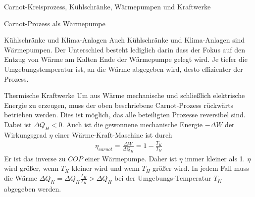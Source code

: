 \begin{chapter}{\titlestr}
\begin{section}{Carnot-Kreisprozess, Kühlschränke, Wärmepumpen und Kraftwerke}
\begin{subsection}{Carnot-Prozess als Wärmepumpe}
\begin{subsubsection}{Kühlschränke und Klima-Anlagen}
Auch Kühlschränke und Klima-Anlagen sind Wärmepumpen. Der Unterschied besteht lediglich darin dass der Fokus auf den Entzug von Wärme am Kalten Ende der Wärmepumpe
gelegt wird. Je tiefer die Umgebungstemperatur ist, an die Wärme abgegeben wird, desto effizienter der Prozess.
\end{subsubsection}
\end{subsection}

\begin{subsection}{Thermische Kraftwerke}
Um aus Wärme mechanische und schließlich elektrische Energie zu erzeugen, muss der oben beschriebene Carnot-Prozess rückwärts betrieben werden. Dies ist möglich,
das alle beteiligten Prozesse reversibel sind. Dabei ist $\Delta Q_H < 0$. Auch ist die gewonnene mechanische Energie $-\Delta W$ der Wirkungsgrad $\eta$ einer Wärme-Kraft-Maschine ist durch
\begin{eqnarray*}
\eta_{carnot} = \frac{\Delta W}{\Delta Q_H} = 1-\frac{T_K}{T_H}
\end{eqnarray*}
Er ist das inverse zu $COP$ einer Wärmepumpe. Daher ist $\eta$ immer kleiner als 1.
$\eta $ wird größer, wenn $T_K$ kleiner wird und wenn $T_H$ größer wird.
In jedem Fall muss die Wärme $\Delta Q_K=\Delta Q_H\frac{T_H}{T_K}>\Delta Q_H$ bei der Umgebungs-Temperatur $T_K$ abgegeben werden.
\end{subsection}
\end{section}


\end{chapter}
